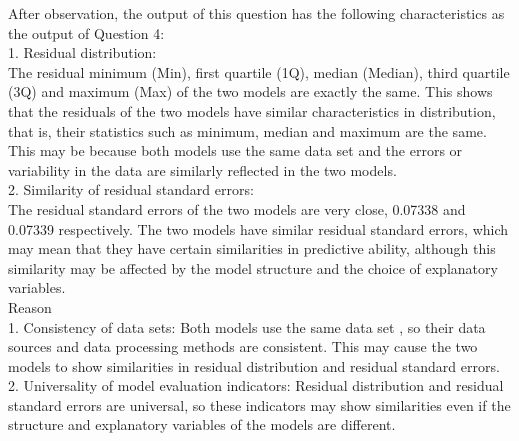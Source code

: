 \documentclass[12pt,letterpaper]{article}
\begin{document}
\begin{enumerate}
		After observation, the output of this question has the following characteristics as the output of Question 4:\\
		1. Residual distribution:\\
		The residual minimum (Min), first quartile (1Q), median (Median), third quartile (3Q) and maximum (Max) of the two models are exactly the same. This shows that the residuals of the two models have similar characteristics in distribution, that is, their statistics such as minimum, median and maximum are the same. This may be because both models use the same data set and the errors or variability in the data are similarly reflected in the two models.\\
		2. Similarity of residual standard errors:\\
		The residual standard errors of the two models are very close, 0.07338 and 0.07339 respectively. The two models have similar residual standard errors, which may mean that they have certain similarities in predictive ability, although this similarity may be affected by the model structure and the choice of explanatory variables.\\
		Reason\\
		1. Consistency of data sets: Both models use the same data set , so their data sources and data processing methods are consistent. This may cause the two models to show similarities in residual distribution and residual standard errors.\\
		2. Universality of model evaluation indicators: Residual distribution and residual standard errors are universal, so these indicators may show similarities even if the structure and explanatory variables of the models are different.\\
	\end{enumerate}
\end{document}
